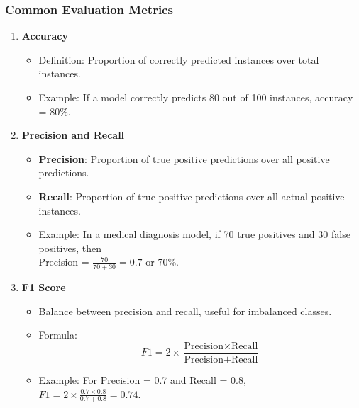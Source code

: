 \documentclass[aspectratio=169]{beamer}
\begin{document}
\begin{frame}[fragile]
    \frametitle{Common Evaluation Metrics}
    \begin{enumerate}
        \item \textbf{Accuracy}
            \begin{itemize}
                \item Definition: Proportion of correctly predicted instances over total instances.
                \item Example: If a model correctly predicts 80 out of 100 instances, accuracy = 80\%.
            \end{itemize}
        \item \textbf{Precision and Recall}
            \begin{itemize}
                \item \textbf{Precision}: Proportion of true positive predictions over all positive predictions.
                \item \textbf{Recall}: Proportion of true positive predictions over all actual positive instances.
                \item Example: In a medical diagnosis model, if 70 true positives and 30 false positives, then \\ 
                Precision = \( \frac{70}{70 + 30} = 0.7 \) or 70\%.
            \end{itemize}
        \item \textbf{F1 Score}
            \begin{itemize}
                \item Balance between precision and recall, useful for imbalanced classes. 
                \item Formula: 
                \begin{equation}
                F1 = 2 \times \frac{\text{Precision} \times \text{Recall}}{\text{Precision} + \text{Recall}} 
                \end{equation}
                \item Example: For Precision = 0.7 and Recall = 0.8, 
                \\ \( F1 = 2 \times \frac{0.7 \times 0.8}{0.7 + 0.8} = 0.74 \).
            \end{itemize}
    \end{enumerate}
\end{frame}
\end{document}
